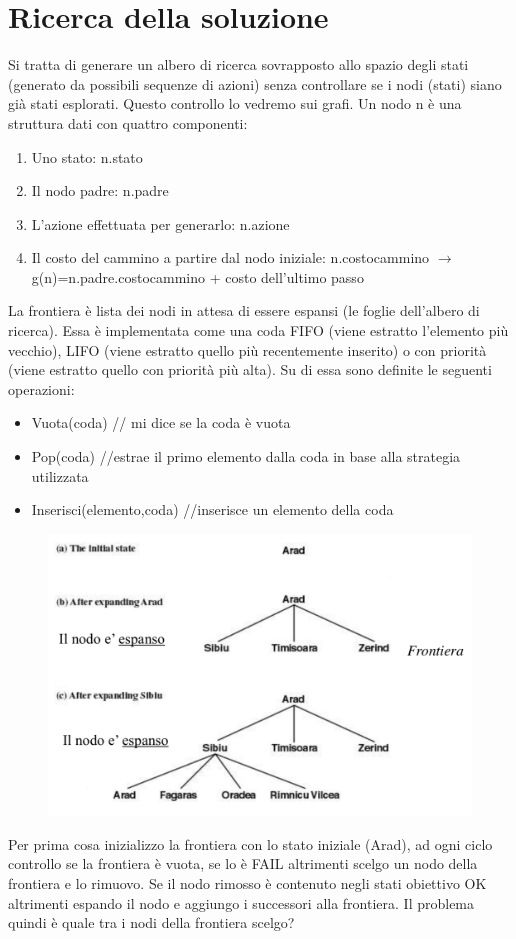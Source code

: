 \documentclass{article}
\begin{document}
\section{Ricerca della soluzione}
Si tratta di generare un albero di ricerca sovrapposto allo spazio degli stati (generato da possibili sequenze di azioni) senza controllare se i nodi (stati) siano già stati esplorati. Questo controllo lo vedremo sui grafi. \newline 
Un nodo n è una struttura dati con quattro componenti:
\begin{enumerate}
    \item Uno stato: n.stato
    \item Il nodo padre: n.padre
    \item L'azione effettuata per generarlo: n.azione
    \item Il costo del cammino a partire dal nodo iniziale: n.costocammino $\rightarrow$ g(n)=n.padre.costocammino + costo dell'ultimo passo
\end{enumerate}
La frontiera è lista dei nodi in attesa di essere espansi (le foglie dell'albero di ricerca). Essa è implementata come una coda FIFO (viene estratto l'elemento più vecchio), LIFO (viene estratto quello più recentemente inserito) o con priorità (viene estratto quello con priorità più alta). Su di essa sono definite le seguenti operazioni:
\begin{itemize}
    \item Vuota(coda) // mi dice se la coda è vuota
    \item Pop(coda) //estrae il primo elemento dalla coda in base alla strategia utilizzata
    \item Inserisci(elemento,coda) //inserisce un elemento della coda
\end{itemize}
\begin{figure}[H]
    \centering
    \includegraphics[scale=0.4]{Images/alberocitta.png}
\end{figure}
Per prima cosa inizializzo la frontiera con lo stato iniziale (Arad), ad ogni ciclo controllo se la frontiera è vuota, se lo è FAIL altrimenti scelgo un nodo della frontiera e lo rimuovo. Se il nodo rimosso è contenuto negli stati obiettivo OK altrimenti espando il nodo e aggiungo i successori alla frontiera. \newline
Il problema quindi è quale tra i nodi della frontiera scelgo?
\clearpage
\end{document}
